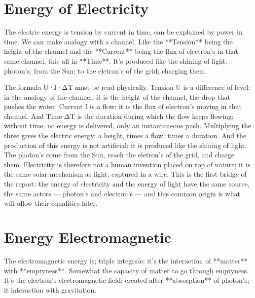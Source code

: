 \documentclass[12pt, letterpaper]{article}
\begin{document}
	\section{Energy of Electricity}
	The electric energy is tension by current in time, can be explained by power in time. We can make analogy with a channel. Like the **Tension** being the height of the channel and the **Current** being the flux of electron's in that same channel, this all in **Time**. It's produced like the shining of light; photon's; from the Sun; to the eletron's of the grid; charging them.
	
	The formula U·I·ΔT must be read physically. Tension U is a difference of level: in the analogy of the channel, it is the height of the channel, the drop that pushes the water. Current I is a flow: it is the flux of electron's moving in that channel. And Time ΔT is the duration during which the flow keeps flowing; without time, no energy is delivered, only an instantaneous push. Multiplying the three gives the electric energy: a height, times a flow, times a duration. And the production of this energy is not artificial: it is produced like the shining of light. The photon's come from the Sun, reach the eletron's of the grid, and charge them. Electricity is therefore not a human invention placed on top of nature; it is the same solar mechanism as light, captured in a wire. This is the first bridge of the report: the energy of electricity and the energy of light have the same source, the same actors — photon's and electron's — and this common origin is what will allow their equalities later.
	
	
	\section{Energy Electromagnetic}
The electromagnetic energy is; triple integrale; it's the interaction of **matter** with **emptyness**. Somewhat the capacity of matter to go through emptyness. It's the electron's electromagnetic field; created after **absorption** of photon's; it interaction with gravitation.
\end{document}
